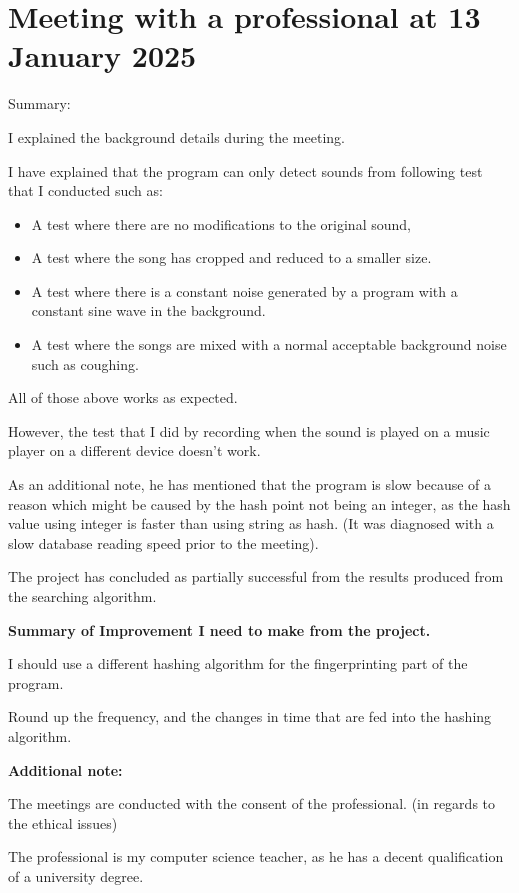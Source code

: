 \section{Meeting with a professional at 13 January 2025}
\label{section:meeting:pro}
Summary:

I explained the background details during the meeting.

I have explained that the program can only detect sounds from following test that I conducted such as:
\begin{itemize}
    \item A test where there are no modifications to the original sound,
    \item A test where the song has cropped and reduced to a smaller size.
    \item A test where there is a constant noise generated by a program with a constant sine wave in the background.
    \item A test where the songs are mixed with a normal acceptable background noise such as coughing.
\end{itemize}

All of those above works as expected.

However, the test that I did by recording when the sound is played on a music player on a different device doesn't work.

As an additional note, he has mentioned that the program is slow because of a reason which might be caused by the hash point not being an integer, as the hash value using integer is faster than using string as hash. (It was diagnosed with a slow database reading speed prior to the meeting).

The project has concluded as partially successful from the results produced from the searching algorithm. 

\textbf{Summary of Improvement I need to make from the project.}

I should use a different hashing algorithm for the fingerprinting part of the program.

Round up the frequency, and the changes in time that are fed into the hashing algorithm.

\textbf{Additional note:}

The meetings are conducted with the consent of the professional. (in regards to the ethical issues)

The professional is my computer science teacher, as he has a decent qualification of a university degree.
